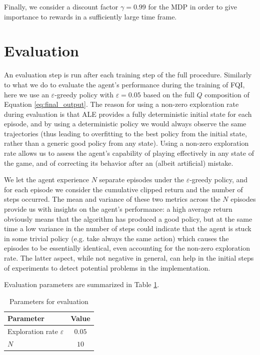 Finally, we consider a discount factor $\gamma = 0.99$ for the MDP in order to 
give importance to rewards in a sufficiently large time frame. 

\section{Evaluation}
An evaluation step is run after each training step of the full procedure.
Similarly to what we do to evaluate the agent's performance during the training
of FQI, here we use an $\varepsilon$-greedy policy with $\varepsilon = 0.05$ 
based on the full $Q$ composition of Equation \eqref{eq:final_output}.
The reason for using a non-zero exploration rate during evaluation is that ALE
provides a fully deterministic initial state for each episode, and by using a 
deterministic policy we would always observe the same trajectories (thus leading
to overfitting to the best policy from the initial state, rather than a generic
good policy from any state). Using a non-zero exploration rate allows us to 
assess the agent's capability of playing effectively in any state of the game, 
and of correcting its behavior after an (albeit artificial) mistake.

We let the agent experience $N$ separate episodes under the $\varepsilon$-greedy 
policy, and for each episode we consider the cumulative clipped return and the
number of steps occurred. The mean and variance of these two metrics across the 
$N$ episodes provide us with insights on the agent's performance: a high average 
return obviously means that the algorithm has produced a good policy, but at the
same time a low variance in the number of steps could indicate that the agent is 
stuck in some trivial policy (e.g. take always the same action) which causes the
episodes to be essentially identical, even accounting for the non-zero 
exploration rate. The latter aspect, while not negative in general, can help in 
the initial steps of experiments to detect potential problems in the 
implementation.

Evaluation parameters are summarized in Table \ref{t:eval}.

%
\begin{table}[h]
    \centering
    \begin{tabular}{l c} 
	\hline
	Parameter & Value \\ 
	\hline 
	Exploration rate $\varepsilon$ & $0.05$ \\
	$N$ &  $10$ \\
	\hline
    \end{tabular}
    \caption{Parameters for evaluation}
    \label{t:eval}
\end{table}
%

